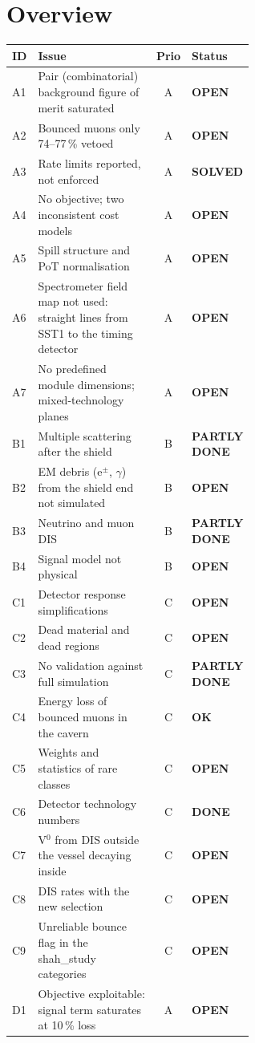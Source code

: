 \documentclass[10pt,a4paper]{article}
\newcommand{\st}[1]{\textbf{#1}}
\newcommand{\stOPEN}{\textcolor{shorange}{\st{OPEN}}}
\newcommand{\stDONE}{\textcolor{okgreen}{\st{DONE}}}
\newcommand{\stOK}{\textcolor{okgreen}{\st{OK}}}
\newcommand{\stPART}{\textcolor{cernblue}{\st{PARTLY DONE}}}
\newcommand{\stSOLVED}{\textcolor{okgreen}{\st{SOLVED}}}
\begin{document}
\section*{Overview}
\renewcommand{\arraystretch}{1.12}
\small
\begin{longtable}{@{}l p{0.60\linewidth} c l@{}}
\toprule
ID & Issue & Prio & Status\\\midrule
\endhead
A1 & Pair (combinatorial) background figure of merit saturated & A & \stOPEN\\
A2 & Bounced muons only 74--77\,\% vetoed & A & \stOPEN\\
A3 & Rate limits reported, not enforced & A & \stSOLVED\\
A4 & No objective; two inconsistent cost models & A & \stOPEN\\
A5 & Spill structure and PoT normalisation & A & \stOPEN\\
A6 & Spectrometer field map not used: straight lines from SST1 to the timing detector & A & \stOPEN\\
A7 & No predefined module dimensions; mixed-technology planes & A & \stOPEN\\
B1 & Multiple scattering after the shield & B & \stPART\\
B2 & EM debris (e$^\pm$, $\gamma$) from the shield end not simulated & B & \stOPEN\\
B3 & Neutrino and muon DIS & B & \stPART\\
B4 & Signal model not physical & B & \stOPEN\\
C1 & Detector response simplifications & C & \stOPEN\\
C2 & Dead material and dead regions & C & \stOPEN\\
C3 & No validation against full simulation & C & \stPART\\
C4 & Energy loss of bounced muons in the cavern & C & \stOK\\
C5 & Weights and statistics of rare classes & C & \stOPEN\\
C6 & Detector technology numbers & C & \stDONE\\
C7 & V$^0$ from DIS outside the vessel decaying inside & C & \stOPEN\\
C8 & DIS rates with the new selection & C & \stOPEN\\
C9 & Unreliable bounce flag in the shah\_study categories & C & \stOPEN\\\midrule
D1 & Objective exploitable: signal term saturates at 10\,\% loss & A & \stOPEN\\

\end{longtable}
\end{document}
